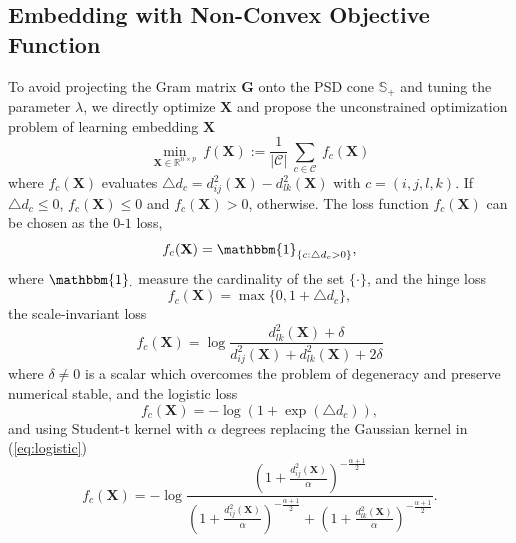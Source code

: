 \documentclass[letterpaper]{article}
\begin{document}
		\subsection{Embedding with Non-Convex Objective Function}
		To avoid projecting the Gram matrix $\mathbf{G}$ onto the PSD cone $\mathbb{S}_{+}$ and tuning the parameter $\lambda$, we directly optimize $\mathbf{X}$ and propose the unconstrained optimization problem of learning embedding $\mathbf{X}$
		\begin{equation}
			\label{eq:2}
			\underset{\mathbf{X}\in\mathbb{R}^{n \times p}}{\min}\ f(\mathbf{X}):=\frac{1}{|\mathcal{C}|}\ \underset{c\in\mathcal{C}}{\sum}\ f_c(\mathbf{X})
		\end{equation}
		where $f_c(\mathbf{X})$ evaluates $\triangle d_c = d^2_{ij}(\mathbf{X})-d^2_{lk}(\mathbf{X})$ with $c=(i,j,l,k)$. If $\triangle d_c\leq 0$, $f_c(\mathbf{X})\leq 0$ and $f_c(\mathbf{X})>0$, otherwise. The loss function $f_c(\mathbf{X})$ can be chosen as the $0$-$1$ loss,
		\begin{equation}
			\label{eq:0-1}
			f_c(\mathbf{X}) = \mathbbm{1}_{\{c:\triangle d_c > 0\}},
		\end{equation}
		where $\mathbbm{1}_{\cdot}$ measure the cardinality of the set $\{\cdot\}$, and the hinge loss \cite{agarwal2007generalized}
		\begin{equation}
			\label{eq:hinge}
			f_c(\mathbf{X}) = \max\{0, 1+\triangle d_c\},
		\end{equation}
		the scale-invariant loss \cite{tamuz2011adaptiive}
		\begin{equation}
			\label{eq:scale-invariant}
			f_c(\mathbf{X}) = \log\frac{d^2_{lk}(\mathbf{X})+\delta}{d^2_{ij}(\mathbf{X})+d^2_{lk}(\mathbf{X})+2\delta}
		\end{equation}
		where $\delta\neq 0$ is a scalar which overcomes the problem of degeneracy and preserve numerical stable, and the logistic loss \cite{vandermaaten2012stochastic}
		\begin{equation}
			\label{eq:logistic}
			f_c(\mathbf{X}) = -\log(1+\exp(\triangle d_c)),
		\end{equation}
		and using Student-t kernel with $\alpha$ degrees replacing the Gaussian kernel in (\ref{eq:logistic}) \cite{vandermaaten2012stochastic}
		\begin{equation}
			\label{eq:student}
			f_c(\mathbf{X}) = -\log\frac{\left(1+\frac{d^2_{ij}(\mathbf{X})}{\alpha}\right)^{-\frac{\alpha+1}{2}}}{\left(1+\frac{d^2_{ij}(\mathbf{X})}{\alpha}\right)^{-\frac{\alpha+1}{2}}+\left(1+\frac{d^2_{lk}(\mathbf{X})}{\alpha}\right)^{-\frac{\alpha+1}{2}}}.
		\end{equation}
\end{document}
